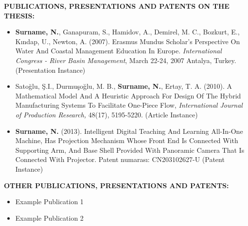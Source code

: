 \textbf{PUBLICATIONS, PRESENTATIONS AND PATENTS ON THE THESIS:} 
\vspace{-3mm}
\begin{itemize}
   \item {\bf Surname, N.}, Ganapuram, S., Hamidov, A., Demirel, M. C., Bozkurt, E., Kındap, U., Newton, A.
   (2007). Erasmus Mundus Scholar's Perspective On Water And Coastal
   Management Education In Europe. 
   \textit{International Congress - River Basin Management}, 
   March 22-24, 2007 Antalya, Turkey. (Presentation Instance)

   \item Satoğlu, Ş.I., Durmuşoğlu, M. B., {\bf Surname, N.}, Ertay, T. A. (2010). A Mathematical Model 
   And A Heuristic Approach For Design Of The Hybrid Manufacturing Systems 
   To Facilitate One-Piece Flow, 
   \textit{International Journal of Production Research,}
   48(17), 5195-5220. (Article Instance)


   \item  {\bf Surname, N.} (2013). Intelligent Digital Teaching And Learning All-In-One Machine,
   Has Projection Mechanism Whose Front End Is Connected With Supporting
   Arm, And Base Shell Provided With Panoramic Camera That Is Connected With
   Projector. Patent numarası: CN203102627-U (Patent Instance)
\end{itemize}

\newpage

\textbf{OTHER PUBLICATIONS, PRESENTATIONS AND PATENTS:} 

\vspace{-3mm}
\begin{itemize}
  \item Example Publication 1
  \item Example Publication 2
\end{itemize}
\vspace{-3mm}

